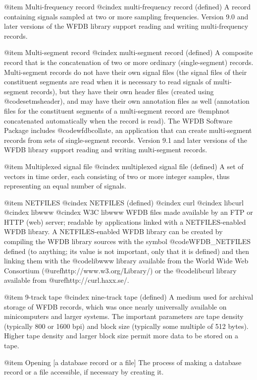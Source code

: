 {{{{{{{{@item Multi-frequency record
@cindex multi-frequency record (defined)
A record containing signals sampled at two or more sampling frequencies.
Version 9.0 and later versions of the WFDB library support reading and
writing multi-frequency records.

@item Multi-segment record
@cindex multi-segment record (defined)
A composite record that is the concatenation of two or more ordinary
(single-segment) records.  Multi-segment records do not have their own
signal files (the signal files of their constituent segments are read
when it is necessary to read signals of multi-segment records), but they
have their own header files (created using @code{setmsheader}),
and may have their own annotation files as well (annotation files for
the constituent segments of a multi-segment record are @emph{not}
concatenated automatically when the record is read).  The WFDB Software
Package includes @code{wfdbcollate}, an
application that can create multi-segment records from sets of
single-segment records.  Version 9.1 and later versions of the WFDB
library support reading and writing multi-segment records.

@item Multiplexed signal file
@cindex multiplexed signal file (defined)
A set of vectors in time order, each consisting of two or more integer
samples, thus representing an equal number of signals.

@item NETFILES
@cindex NETFILES (defined)
@cindex curl
@cindex libcurl
@cindex libwww
@cindex W3C libwww
WFDB files made available by an FTP or HTTP (web) server;  readable
by applications linked with a NETFILES-enabled WFDB library.  A
NETFILES-enabled WFDB library can be created by compiling the WFDB
library sources with the symbol @code{WFDB_NETFILES} defined (to anything;
its value is not important, only that it is defined) and then linking
them with the @code{libwww} library available from the World Wide Web
Consortium (@uref{http://www.w3.org/Library/}) or the @code{libcurl}
library available from @uref{http://curl.haxx.se/}.

@item 9-track tape
@cindex nine-track tape (defined)
A medium used for archival storage of WFDB records, which was once nearly
universally available on minicomputers and larger systems.  The
important parameters are tape density (typically 800 or 1600 bpi) and
block size (typically some multiple of 512 bytes).  Higher tape density
and larger block size permit more data to be stored on a tape.

@item Opening [a database record or a file]
The process of making a database record or a file accessible, if
necessary by creating it.

}}}}}}}}
